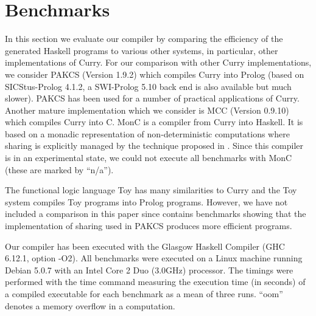 \documentclass{llncs}
\begin{document}
\section{Benchmarks}
\label{sec:Benchmarks}

In this section we evaluate our compiler by comparing the
efficiency of the generated Haskell programs to various
other systems, in particular, other implementations of Curry.
For our comparison with other Curry implementations,
we consider PAKCS \cite{Hanus10PAKCS} (Version 1.9.2) which compiles
Curry into Prolog \cite{AntoyHanus00FROCOS}
(based on SICStus-Prolog 4.1.2, a SWI-Prolog 5.10 back end is also
available
but much slower). PAKCS has been used for a number of practical
applications of Curry.
Another mature implementation which we consider is MCC \cite{Lux99FLOPS}
(Version 0.9.10) which compiles Curry into C.
MonC \cite{BrasselFischerHanusReck11} is a compiler
from Curry into Haskell. It is based on a monadic representation
of non-deterministic computations where sharing is explicitly
managed by the technique proposed in \cite{FischerKiselyovShan09}.
Since this compiler
is in an experimental state, we could not execute all benchmarks with
MonC (these are marked by ``n/a'').

The functional logic language Toy \cite{Lopez-FraguasSanchez-Hernandez99}
has many similarities to Curry and the Toy system compiles Toy programs
into Prolog programs. However, we have not included a comparison
in this paper since \cite{AntoyHanus00FROCOS} contains benchmarks
showing that the implementation of sharing used in PAKCS produces
more efficient programs.

Our compiler has been executed with the Glasgow Haskell Compiler
(GHC 6.12.1, option -O2). All benchmarks were executed on a Linux machine
running Debian 5.0.7 with an Intel Core 2 Duo (3.0GHz) processor.
The timings were performed with the time command measuring the
execution time (in seconds) of a compiled executable for each benchmark
as a mean of three runs. ``oom'' denotes a memory overflow in a computation.
\end{document}
